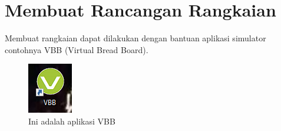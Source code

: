 \section{Membuat Rancangan Rangkaian}
    Membuat rangkaian dapat dilakukan dengan bantuan aplikasi simulator contohnya VBB (Virtual Bread Board).
\begin{figure}[!htbp]
  \centering
  \includegraphics[width=.45\textwidth]{figures/VBB/vbb.png}
  \caption{Ini adalah aplikasi VBB}\label{fig:vbb}
\end{figure}

